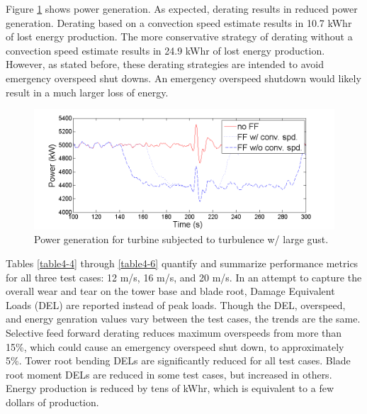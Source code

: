 Figure \ref{fig4-31} shows power generation. As expected, derating results in reduced power generation. Derating based on a convection speed estimate results in 10.7 kWhr of lost energy production. The more conservative strategy of derating without a convection speed estimate results in 24.9 kWhr of lost energy production. However, as stated before, these derating strategies are intended to avoid emergency overspeed shut downs. An emergency overspeed shutdown would likely result in a much larger loss of energy.

\begin{figure}[htbp]
	\centering
		\includegraphics[trim = {1cm 0 2cm 0}, clip, width = \linewidth]{Figures/ch4Figures/fig4-31.png}
		
	\caption{Power generation for turbine subjected to turbulence w/ large gust.}
	\label{fig4-31}
\end{figure}

Tables \ref{table4-4} through \ref{table4-6} quantify and summarize performance metrics for all three test cases: 12 m/s, 16 m/s, and 20 m/s. In an attempt to capture the overall wear and tear on the tower base and blade root, Damage Equivalent Loads (DEL) are reported instead of peak loads. Though the DEL, overspeed, and energy genration values vary between the test cases, the trends are the same. Selective feed forward derating reduces maximum overspeeds from more than 15\%, which could cause an emergency overspeed shut down, to approximately 5\%. Tower root bending DELs are significantly reduced for all test cases. Blade root moment DELs are reduced in some test cases, but increased in others. Energy production is reduced by tens of kWhr, which is equivalent to a few dollars of production.


